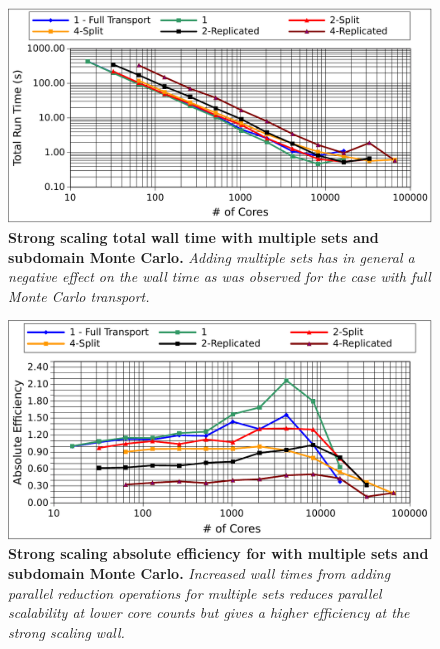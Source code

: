 \begin{figure}[t!]
  \begin{center}
    \includegraphics[width=6in]{chapters/parallel_mc/titan_strong_subdomain_ms_time.pdf}
  \end{center}
  \caption{\textbf{Strong scaling total wall time with multiple sets
      and subdomain Monte Carlo.} \textit{Adding multiple sets has in
      general a negative effect on the wall time as was observed for
      the case with full Monte Carlo transport.}}
  \label{fig:titan_strong_subdomain_ms_time}
\end{figure}

\begin{figure}[t!]
  \begin{center}
    \includegraphics[width=6in]{chapters/parallel_mc/titan_strong_subdomain_ms.pdf}
  \end{center}
  \caption{\textbf{Strong scaling absolute efficiency for with
      multiple sets and subdomain Monte Carlo.} \textit{Increased wall
      times from adding parallel reduction operations for multiple
      sets reduces parallel scalability at lower core counts but gives
      a higher efficiency at the strong scaling wall.}}
  \label{fig:titan_strong_subdomain_ms}
\end{figure}

